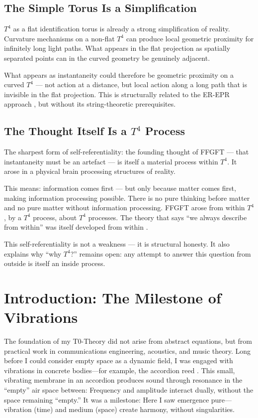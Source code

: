 \subsection{The Simple Torus Is a Simplification}

$T^4$ as a flat identification torus is already a strong simplification of reality. Curvature mechanisms on a non-flat $T^4$ can produce local geometric proximity for infinitely long light paths. What appears in the flat projection as spatially separated points can in the curved geometry be genuinely adjacent.

What appears as instantaneity could therefore be geometric proximity on a curved $T^4$ --- not action at a distance, but local action along a long path that is invisible in the flat projection. This is structurally related to the ER-EPR approach \cite{Maldacena2013}, but without its string-theoretic prerequisites.

\subsection{The Thought Itself Is a $T^4$ Process}

The sharpest form of self-referentiality: the founding thought of FFGFT --- that instantaneity must be an artefact --- is itself a material process within $T^4$. It arose in a physical brain processing structures of reality.

This means: information comes first --- but only because matter comes first, making information processing possible. There is no pure thinking before matter and no pure matter without information processing. FFGFT arose from within $T^4$, by a $T^4$ process, about $T^4$ processes. The theory that says ``we always describe from within'' was itself developed from within \cite{Epistemologie2026}.

This self-referentiality is not a weakness --- it is structural honesty. It also explains why ``why $T^4$?'' remains open: any attempt to answer this question from outside is itself an inside process.

\section{Introduction: The Milestone of Vibrations}
	The foundation of my T0-Theory did not arise from abstract equations, but from practical work in communications engineering, acoustics, and music theory. Long before I could consider empty space as a dynamic field, I was engaged with vibrations in concrete bodies—for example, the accordion reed \cite{ricot2005}. This small, vibrating membrane in an accordion produces sound through resonance in the ``empty'' air space between: Frequency and amplitude interact dually, without the space remaining ``empty.'' It was a milestone: Here I saw emergence pure—vibration (time) and medium (space) create harmony, without singularities.
	
